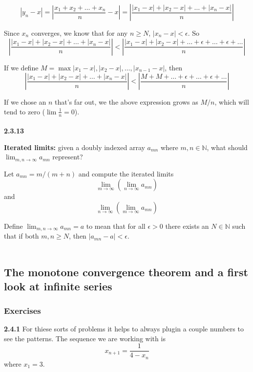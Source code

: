 $$
| y_n - x | 
= \left| \frac{x_1 + x_2 + \ldots + x_n}{n} - x \right|
= \left| \frac{|x_1 -x| + |x_2-x| + \ldots + |x_n-x|}{n} \right|
$$

Since $x_n$ converges, we know that for any $n \geq N$, $|x_n - x| < \epsilon$.
So
$$
\left| \frac{|x_1 -x| + |x_2-x| + \ldots + |x_n-x|}{n} \right|
< \left| \frac{|x_1 -x| + |x_2-x| + \ldots + \epsilon + \ldots + \epsilon + \ldots}{n} \right|
$$

If we define $M = \max{|x_1 -x|, |x_2-x|, \ldots , |x_{n-1} - x|}$, then
$$
\left| \frac{|x_1 -x| + |x_2-x| + \ldots + |x_n-x|}{n} \right|
< \left| \frac{M + M + \ldots + \epsilon + \ldots + \epsilon + \ldots}{n} \right|
$$

If we chose an $n$ that's far out, we the above expression grows as $M/n$, which will tend to
zero ($\lim \frac{1}{n} = 0$).
\\~\\



\textbf{2.3.13}

\textbf{Iterated limits:} given a doubly indexed array $a_{mn}$ where $m, n \in \mathbb{N}$,
what should $\lim_{m,n \rightarrow \infty} a_{mn}$ represent?

Let $a_{mn} = m / (m+n)$ and compute the iterated limits
$$
\lim_{m\rightarrow\infty} \left( \lim_{n\rightarrow\infty} a_{mn} \right)
$$
and
$$
\lim_{n\rightarrow\infty} \left( \lim_{m\rightarrow\infty} a_{mn} \right)
$$

Define $\lim_{m,n\rightarrow\infty} a_{mn} = a$ to mean that for all $\epsilon > 0$
there exists an $N \in \mathbb{N}$ such that if both $m,n \geq N$, then $|a_{mn} - a|<\epsilon$.
\\~\\



\subsection{The monotone convergence theorem and a first look at infinite series}

\subsubsection{Exercises}

\textbf{2.4.1} For thiese sorts of problems it helps to always plugin a couple numbers to see the patterns.
The sequence we are working with is
$$
x_{n+1} = \frac{1}{4 - x_n}
$$
where $x_1 = 3$.

